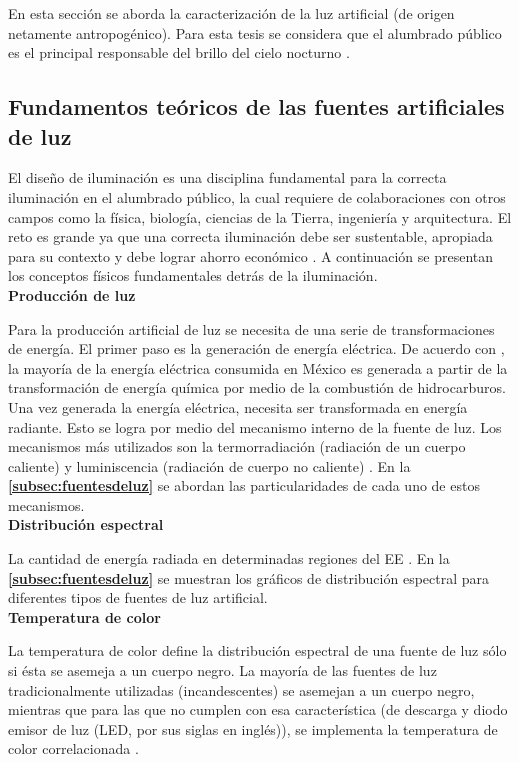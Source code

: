 En esta sección se aborda la caracterización de la luz artificial (de origen netamente antropogénico). Para esta tesis se considera que el alumbrado público es el principal responsable del brillo del cielo nocturno \citep{Solano2013b}.

\subsection{Fundamentos teóricos de las fuentes artificiales de luz}

El diseño de iluminación es una disciplina fundamental para la correcta iluminación en el alumbrado público, la cual requiere de colaboraciones con otros campos como la física, biología, ciencias de la Tierra, ingeniería y arquitectura. El reto es grande ya que una correcta iluminación debe ser sustentable, apropiada para su contexto y debe lograr ahorro económico \citep{LibroCL, Globaldiscussion}. A continuación se presentan los conceptos físicos fundamentales detrás de la iluminación.\\


\textbf{Producción de luz}

Para la producción artificial de luz se necesita de una serie de transformaciones de energía. El primer paso es la generación de energía eléctrica. De acuerdo con \cite{Ramos2012}, la mayoría de la energía eléctrica consumida en México es generada a partir de la transformación de energía química por medio de la combustión de hidrocarburos.\\

Una vez generada la energía eléctrica, necesita ser transformada en energía radiante. Esto se logra por medio del mecanismo interno de la fuente de luz. Los mecanismos más utilizados son la termorradiación (radiación de un cuerpo caliente) y luminiscencia (radiación de cuerpo no caliente) \citep{LibroCL}. En la \textbf{\autoref{subsec:fuentesdeluz}} se abordan las particularidades de cada uno de estos mecanismos.\\


\textbf{Distribución espectral}

La cantidad de energía radiada en determinadas regiones del EE \citep{Solano2013}. En la \textbf{\autoref{subsec:fuentesdeluz}} se muestran los gráficos de distribución espectral para diferentes tipos de fuentes de luz artificial.\\

  
\textbf{Temperatura de color}

La temperatura de color define la distribución espectral de una fuente de luz sólo si ésta se asemeja a un cuerpo negro. La mayoría de las fuentes de luz tradicionalmente utilizadas (incandescentes) se asemejan a un cuerpo negro, mientras que para las que no cumplen con esa característica (de descarga y diodo emisor de luz (LED, por sus siglas en inglés)), se implementa la temperatura de color correlacionada \citep{LibroCL}.\\

